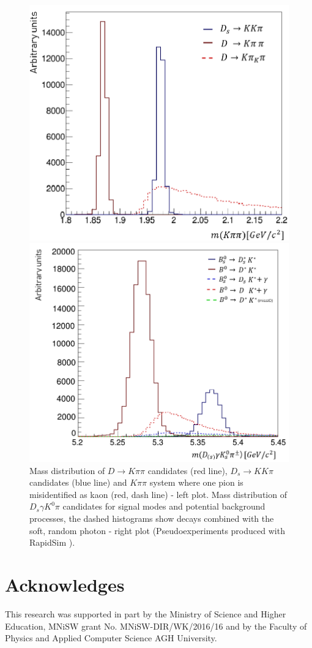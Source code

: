 \documentclass{appolb}
\begin{document}
\begin{figure}[h!]
\begin{minipage}{0.5\textwidth}
  \centering
\includegraphics[width=6.2 cm]{D3.png}
\end{minipage}%
\begin{minipage}{0.5\textwidth}
  \centering
\includegraphics[width= 6.7 cm]{B_new.png}
\end{minipage}%
\caption{Mass distribution of $D \to K \pi \pi$ candidates (red line), $D_s \to K K \pi$ candidates (blue line) and $K\pi\pi$ system where one pion is misidentified as kaon (red, dash line) - left plot.
Mass distribution of $D_s \gamma K^0 \pi$ candidates for signal modes and potential background processes, the dashed histograms show decays combined with the soft, random photon - right plot (Pseudoexperiments produced with RapidSim \cite{rapidsim}).}
\label{Fig:F3}
\end{figure}

\section{Acknowledges}
This research was supported in part by the Ministry of Science and Higher Education,
MNiSW  grant No. MNiSW-DIR/WK/2016/16 and by the Faculty of Physics and Applied Computer Science AGH University.
\end{document}
